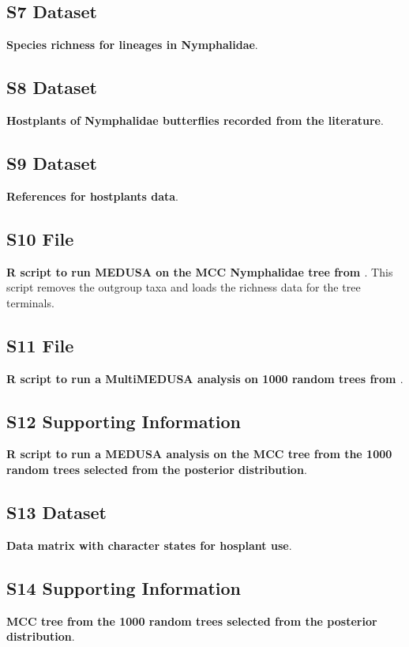 \documentclass[10pt,letterpaper]{article}
\begin{document}
\subsection*{S7 Dataset}
\label{S7_Dataset}
{\bf Species richness for lineages in Nymphalidae}.

\subsection*{S8 Dataset}
\label{S8_Dataset}
{\bf Hostplants of Nymphalidae
butterflies recorded from the literature}.

\subsection*{S9 Dataset}
\label{S9_Dataset}
{\bf References for hostplants data}.

\subsection*{S10 File}
\label{S10_File}
{\bf R script to run MEDUSA on the MCC Nymphalidae tree from
\cite{wahlberg2009}}. This script removes the outgroup
taxa and loads the richness data for the tree terminals.

\subsection*{S11 File}
\label{S11_File}
{\bf R script to run a MultiMEDUSA analysis on 1000 random trees from
\cite{wahlberg2009}}.

\subsection*{S12 Supporting Information}
\label{S12_Supporting_Information}
{\bf R script to run a MEDUSA
analysis on the MCC tree from the 1000 random trees selected from the
posterior distribution}.

\subsection*{S13 Dataset}
\label{S13_Dataset}
{\bf Data matrix with character states for hosplant use}.

\subsection*{S14 Supporting Information}
\label{S14_Supporting_Information}
{\bf MCC tree from the 1000 random
trees selected from the posterior distribution}.
\end{document}
